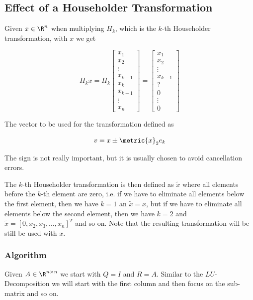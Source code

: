 \subsection{Effect of a Householder Transformation}

Given \(x \in \R^n\) when multiplying \(H_k\), which is the \(k\)-th Householder transformation,
with \(x\) we get

\[
    H_k x =
    H_k
    \begin{bmatrix}
        x_1 \\ 
        x_2 \\ 
        \vdots \\
        x_{k - 1} \\ 
        x_k \\ 
        x_{k + 1} \\ 
        \vdots \\
        x_n
    \end{bmatrix}
    = 
    \begin{bmatrix}
        x_1 \\ 
        x_2 \\ 
        \vdots \\
        x_{k - 1} \\     
        ? \\ 
        0 \\ 
        \vdots \\
        0
    \end{bmatrix}
\]

The vector to be used for the transformation defined as 

\[
    v = 
    x \pm \metric{x}_2 e_k
\]

The sign is not really important, but it is usually chosen to avoid cancellation errors. 

The \(k\)-th Householder transformation is then defined as \(\tilde{x}\) where all elements before the \(k\)-th element are zero, i.e. if we have to eliminate 
all elements below the first element, then we have \(k = 1\) an \(\tilde{x} = x\), but if we have to eliminate all elements below the second element, then we have \(k = 2\) and \(\tilde{x} = [0, x_2, x_3, \dots, x_n]^T\) and so on.
Note that the resulting transformation will be still be used with \(x\).


\subsubsection*{Algorithm}

Given \(A \in \R^{n \times n}\) we start with \(Q = I\) and \(R = A\).
Similar to the \(LU\)-Decomposition we will start with the first column and then focus on the sub-matrix and so on.

